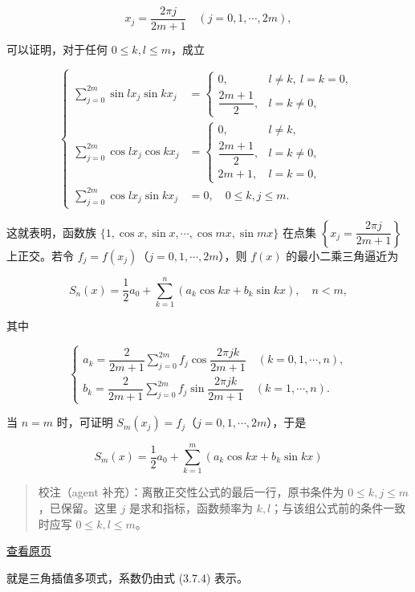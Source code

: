 \documentclass[
  10pt,
  fontset=fandol]{ctexart}
\begin{document}
\[
x_j=\frac{2\pi j}{2m+1}\quad(j=0,1,\cdots,2m),
\]

可以证明，对于任何 \(0\leqslant k,l\leqslant m\)，成立

\[
\left\{\begin{aligned}
\sum_{j=0}^{2m}\sin lx_j\sin kx_j&=\begin{cases}
0,&l\ne k,\ l=k=0,\\
\dfrac{2m+1}{2},&l=k\ne0,
\end{cases}\\[4pt]
\sum_{j=0}^{2m}\cos lx_j\cos kx_j&=\begin{cases}
0,&l\ne k,\\
\dfrac{2m+1}{2},&l=k\ne0,\\
2m+1,&l=k=0,
\end{cases}\\[4pt]
\sum_{j=0}^{2m}\cos lx_j\sin kx_j&=0,\quad0\leqslant k,j\leqslant m.
\end{aligned}\right.
\]

这就表明，函数族 \(\{1,\allowbreak \cos x,\allowbreak \sin x,\allowbreak \cdots,\allowbreak \cos mx,\allowbreak \sin mx\}\) 在点集 \(\left\{x_j=\dfrac{2\pi j}{2m+1}\right\}\) 上正交。若令 \(f_j=f(x_j)\)（\(j=0,1,\cdots,2m\)），则 \(f(x)\) 的最小二乘三角逼近为

\[
S_n(x)=\frac12a_0+\sum_{k=1}^n(a_k\cos kx+b_k\sin kx),\quad n<m,
\]

其中

\[
\begin{cases}
a_k=\dfrac2{2m+1}\displaystyle\sum_{j=0}^{2m}f_j\cos\dfrac{2\pi jk}{2m+1}\quad(k=0,1,\cdots,n),\\[4pt]
b_k=\dfrac2{2m+1}\displaystyle\sum_{j=0}^{2m}f_j\sin\dfrac{2\pi jk}{2m+1}\quad(k=1,\cdots,n).
\end{cases}\tag{3.7.4}
\]

当 \(n=m\) 时，可证明 \(S_m(x_j)=f_j\)（\(j=0,1,\cdots,2m\)），于是

\[
S_m(x)=\frac12a_0+\sum_{k=1}^m(a_k\cos kx+b_k\sin kx)
\]

\begin{quote}
校注（agent 补充）：离散正交性公式的最后一行，原书条件为 \(0\leqslant k,j\leqslant m\)，已保留。这里 \(j\) 是求和指标，函数频率为 \(k,l\)；与该组公式前的条件一致时应写 \(0\leqslant k,l\leqslant m\)。
\end{quote}

\href{../../source-images/pdf-086.jpeg}{查看原页}

就是三角插值多项式，系数仍由式 (3.7.4) 表示。
\end{document}
